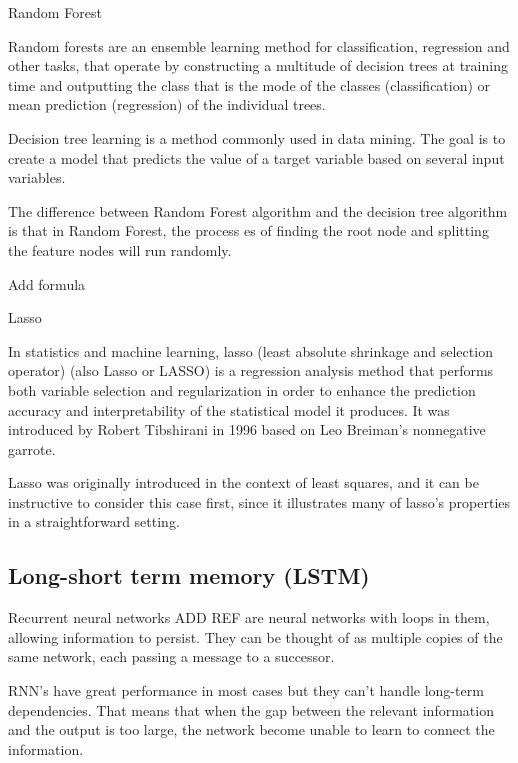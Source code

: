 \documentclass[12pt]{report}
\begin{document}
\begin{description}
 \item Random Forest
  
 Random forests  are an ensemble learning method for classification, 
 regression and other tasks, that operate by constructing a multitude of decision trees at training time 
 and outputting the class that is the mode of the classes (classification) or mean prediction (regression) 
 of the individual trees.
 
 Decision tree learning is a method commonly used in data mining. The goal is to create a model 
 that predicts the value of a target variable based on several input variables. 
 
 The difference between Random Forest algorithm and the decision tree algorithm is that in 
 Random Forest, the process es of finding the root node and splitting the feature nodes will run
 randomly.
 
 Add formula
 
 \item Lasso
 
 In statistics and machine learning, lasso (least absolute shrinkage and selection operator)
 (also Lasso or LASSO) is a regression analysis method that performs both variable selection and
 regularization in order to enhance the prediction accuracy and interpretability of the statistical
 model it produces. It was introduced by Robert Tibshirani in 1996 based on Leo Breiman’s
 nonnegative garrote.
 
 Lasso was originally introduced in the context of least squares, and it can be instructive to consider 
 this case first, since it illustrates many of lasso’s properties in a straightforward setting.
 
\end{description}


\subsection{Long-short term memory (LSTM)}

Recurrent neural networks ADD REF are neural networks with loops in them, allowing information
to persist. They can be thought of as multiple copies of the same network, each passing a message
to a successor.

RNN's have great performance  in most cases but they can't handle long-term dependencies. That 
means that when the gap between the relevant information and the output is too large, the network
become unable to learn to connect the information.
\end{document}
